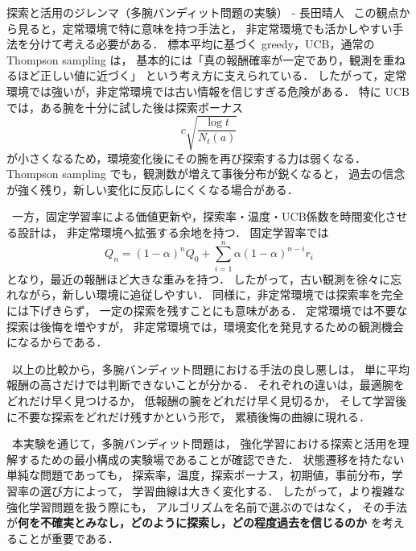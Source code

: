 \begin{column}{探索と活用のジレンマ（多腕バンディット問題の実験） - 長田晴人}
\ この観点から見ると，定常環境で特に意味を持つ手法と，
非定常環境でも活かしやすい手法を分けて考える必要がある．
標本平均に基づく greedy，UCB，通常の Thompson sampling は，
基本的には「真の報酬確率が一定であり，観測を重ねるほど正しい値に近づく」
という考え方に支えられている．
したがって，定常環境では強いが，非定常環境では古い情報を信じすぎる危険がある．
特に UCB では，ある腕を十分に試した後は探索ボーナス
\[
    c\sqrt{\frac{\log t}{N_t(a)}}
\]
が小さくなるため，環境変化後にその腕を再び探索する力は弱くなる．
Thompson sampling でも，観測数が増えて事後分布が鋭くなると，
過去の信念が強く残り，新しい変化に反応しにくくなる場合がある．

\ 一方，固定学習率による価値更新や，探索率・温度・UCB係数を時間変化させる設計は，
非定常環境へ拡張する余地を持つ．
固定学習率では
\[
    Q_n
    =
    (1-\alpha)^nQ_0
    +
    \sum_{i=1}^{n}\alpha(1-\alpha)^{n-i}r_i
\]
となり，最近の報酬ほど大きな重みを持つ．
したがって，古い観測を徐々に忘れながら，新しい環境に追従しやすい．
同様に，非定常環境では探索率を完全には下げきらず，
一定の探索を残すことにも意味がある．
定常環境では不要な探索は後悔を増やすが，
非定常環境では，環境変化を発見するための観測機会になるからである．

\ 以上の比較から，多腕バンディット問題における手法の良し悪しは，
単に平均報酬の高さだけでは判断できないことが分かる．
それぞれの違いは，最適腕をどれだけ早く見つけるか，
低報酬の腕をどれだけ早く見切るか，
そして学習後に不要な探索をどれだけ残すかという形で，
累積後悔の曲線に現れる．

\ 本実験を通じて，多腕バンディット問題は，
強化学習における探索と活用を理解するための最小構成の実験場であることが確認できた．
状態遷移を持たない単純な問題であっても，
探索率，温度，探索ボーナス，初期値，事前分布，学習率の選び方によって，
学習曲線は大きく変化する．
したがって，より複雑な強化学習問題を扱う際にも，
アルゴリズムを名前で選ぶのではなく，
その手法が\textbf{何を不確実とみなし，どのように探索し，どの程度過去を信じるのか}
を考えることが重要である．

\end{column}
\clearpage
